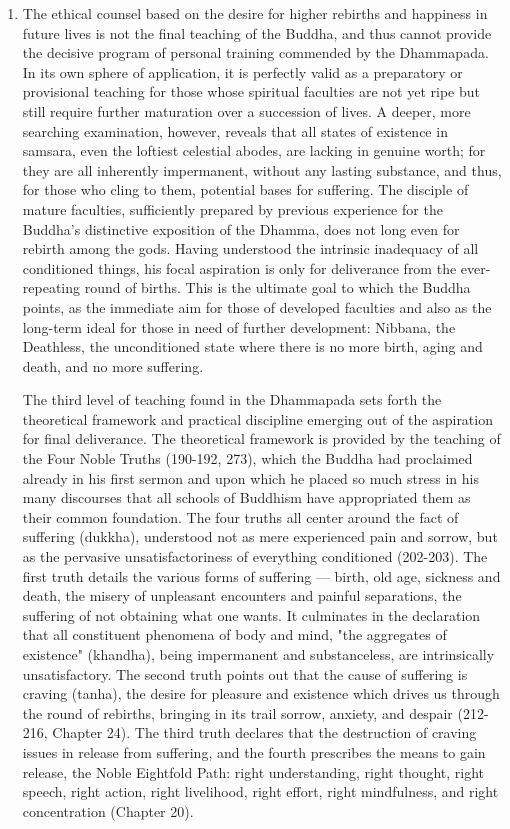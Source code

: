 \begin{enumerate}[i]
\item The ethical counsel based on the desire for higher rebirths and happiness in future lives is not the final teaching of the Buddha, and thus cannot provide the decisive program of personal training commended by the Dhammapada. In its own sphere of application, it is perfectly valid as a preparatory or provisional teaching for those whose spiritual faculties are not yet ripe but still require further maturation over a succession of lives. A deeper, more searching examination, however, reveals that all states of existence in samsara, even the loftiest celestial abodes, are lacking in genuine worth; for they are all inherently impermanent, without any lasting substance, and thus, for those who cling to them, potential bases for suffering. The disciple of mature faculties, sufficiently prepared by previous experience for the Buddha's distinctive exposition of the Dhamma, does not long even for rebirth among the gods. Having understood the intrinsic inadequacy of all conditioned things, his focal aspiration is only for deliverance from the ever-repeating round of births. This is the ultimate goal to which the Buddha points, as the immediate aim for those of developed faculties and also as the long-term ideal for those in need of further development: Nibbana, the Deathless, the unconditioned state where there is no more birth, aging and death, and no more suffering.

The third level of teaching found in the Dhammapada sets forth the theoretical framework and practical discipline emerging out of the aspiration for final deliverance. The theoretical framework is provided by the teaching of the Four Noble Truths (190-192, 273), which the Buddha had proclaimed already in his first sermon and upon which he placed so much stress in his many discourses that all schools of Buddhism have appropriated them as their common foundation. The four truths all center around the fact of suffering (dukkha), understood not as mere experienced pain and sorrow, but as the pervasive unsatisfactoriness of everything conditioned (202-203). The first truth details the various forms of suffering — birth, old age, sickness and death, the misery of unpleasant encounters and painful separations, the suffering of not obtaining what one wants. It culminates in the declaration that all constituent phenomena of body and mind, "the aggregates of existence" (khandha), being impermanent and substanceless, are intrinsically unsatisfactory. The second truth points out that the cause of suffering is craving (tanha), the desire for pleasure and existence which drives us through the round of rebirths, bringing in its trail sorrow, anxiety, and despair (212-216, Chapter 24). The third truth declares that the destruction of craving issues in release from suffering, and the fourth prescribes the means to gain release, the Noble Eightfold Path: right understanding, right thought, right speech, right action, right livelihood, right effort, right mindfulness, and right concentration (Chapter 20).


\end{enumerate}
